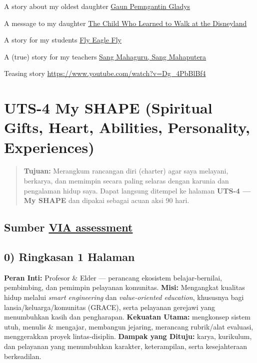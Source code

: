 \documentclass[
  letterpaper,
  DIV=11,
  numbers=noendperiod]{scrreprt}
\begin{document}
A story about my oldest daughter
\href{https://azrl.wordpress.com/2020/07/18/gaun-pengantin-gladys/\#comment-28004}{Gaun
Pemngantin Gladys}

A message to my daughter
\href{https://azrl.wordpress.com/2021/10/06/the-child-who-learned-to-walk-at-the-disneyland/}{The
Child Who Learned to Walk at the Disneyland}

A story for my students
\href{https://azrl.wordpress.com/2008/04/21/fly-my-eagle-fly/}{Fly Eagle
Fly}

A (true) story for my teachers
\href{\%3Chttps://azrl.wordpress.com/2012/11/28/perginya-sang-mahaputera-dan-mahaguru-berkemeja-putih/}{Sang
Mahaguru, Sang Mahaputera}

Teasing story \url{https://www.youtube.com/watch?v=Dg_4PbBlBf4}


\chapter{UTS-4 My SHAPE (Spiritual Gifts, Heart, Abilities, Personality,
Experiences)}\label{uts-4-my-shape-spiritual-gifts-heart-abilities-personality-experiences}

\begin{quote}
\textbf{Tujuan:} Merangkum rancangan diri (charter) agar saya melayani,
berkarya, dan memimpin secara paling selaras dengan karunia dan
pengalaman hidup saya. Dapat langsung ditempel ke halaman \textbf{UTS-4
--- My SHAPE} dan dipakai sebagai acuan aksi 90 hari.
\end{quote}

\section{\texorpdfstring{Sumber
\href{StrengthsProfile-Armein-Langi.pdf}{VIA
assessment}}{Sumber VIA assessment}}\label{sumber-via-assessment}

\section{0) Ringkasan 1 Halaman}\label{ringkasan-1-halaman}

\textbf{Peran Inti:} Profesor \& Elder --- perancang ekosistem
belajar-bernilai, pembimbing, dan pemimpin pelayanan komunitas.
\textbf{Misi:} Mengangkat kualitas hidup melalui \emph{smart
engineering} dan \emph{value-oriented education}, khususnya bagi
lansia/keluarga/komunitas (GRACE), serta pelayanan gerejawi yang
menumbuhkan kasih dan pengharapan. \textbf{Kekuatan Utama:} mengkonsep
sistem utuh, menulis \& mengajar, membangun jejaring, merancang
rubrik/alat evaluasi, menggerakkan proyek lintas-disiplin.
\textbf{Dampak yang Dituju:} karya, kurikulum, dan pelayanan yang
menumbuhkan karakter, keterampilan, serta kesejahteraan berkeadilan.
\end{document}
